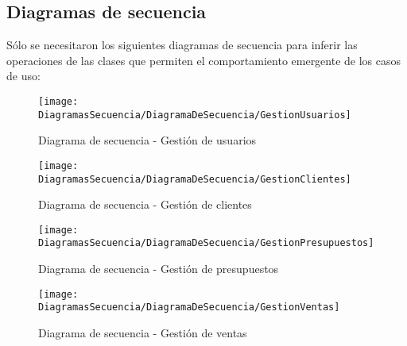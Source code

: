 	\clearpage %
	\subsection{Diagramas de secuencia}
	Sólo se necesitaron los siguientes diagramas de secuencia para inferir las operaciones de las clases que permiten el comportamiento emergente de los casos de uso:

	\begin{figure}[H]
		\centering
		\texttt{[image: DiagramasSecuencia/DiagramaDeSecuencia/GestionUsuarios]}
		\caption{Diagrama de secuencia - Gestión de usuarios}
		\label{fig:Diagrama de secuencia - Gestión de usuarios}
	\end{figure}

	\begin{figure}[H]
		\centering
		\texttt{[image: DiagramasSecuencia/DiagramaDeSecuencia/GestionClientes]}
		\caption{Diagrama de secuencia - Gestión de clientes}
		\label{fig:Diagrama de secuencia - Gestión de clientes}
	\end{figure}

	\begin{figure}[H]
		\centering
		\texttt{[image: DiagramasSecuencia/DiagramaDeSecuencia/GestionPresupuestos]}
		\caption{Diagrama de secuencia - Gestión de presupuestos}
		\label{fig:Diagrama de secuencia - Gestión de presupuestos}
	\end{figure}

	\begin{figure}[H]
		\centering
		\texttt{[image: DiagramasSecuencia/DiagramaDeSecuencia/GestionVentas]}
		\caption{Diagrama de secuencia - Gestión de ventas}
		\label{fig:Diagrama de secuencia - Gestión de ventas}
	\end{figure}

	\clearpage %
	
	
		
	
    